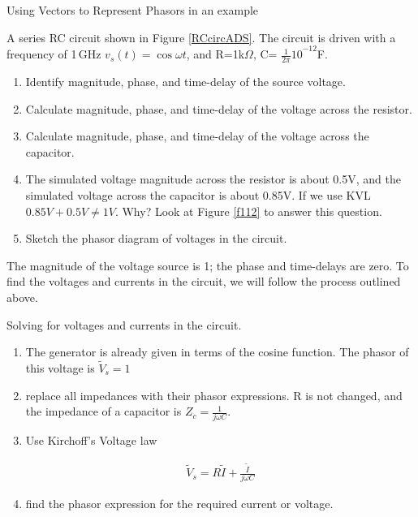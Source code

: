 \documentclass{ximera}
\begin{document}
\begin{example}
Using Vectors to Represent Phasors in an example

A series RC circuit shown in Figure \ref{RCcircADS}. The circuit is driven with a frequency of 1\,GHz $v_s(t)=  \cos \omega t$, and R=1k$\Omega $, C= ${\frac{1}{2\pi }10}^{-12}$F. 
 


\begin{enumerate}
\item  Identify magnitude, phase, and time-delay of the source voltage.

\item  Calculate magnitude, phase, and time-delay of the voltage across the resistor.

\item  Calculate magnitude, phase, and time-delay of the voltage across the capacitor.

\item  The simulated voltage magnitude across the resistor is about 0.5V, and the simulated voltage across the capacitor is about 0.85V.  If we use KVL $ 0.85V+0.5V \neq 1V$. Why? Look at Figure \ref{f112}  to answer this question.

\item Sketch the phasor diagram of voltages in the circuit. 

\end{enumerate}

\begin{explanation} 
The magnitude of the voltage source is 1; the phase and time-delays are zero. To find the voltages and currents in the circuit, we will follow the process outlined above.

Solving for voltages and currents in the circuit.
 \begin{enumerate}
\item The generator is already given in terms of the cosine function. The phasor of this voltage is $\tilde{V}_s= 1$ 
\item replace all impedances with their phasor expressions. R is not changed, and the impedance of a capacitor is $Z_c=\frac{1}{j \omega C}$.
\item  Use Kirchoff's Voltage law 

\begin{eqnarray}
\tilde{V}_s  = R \tilde{I}    + \frac{\tilde{I}}{j \omega C}  
\end{eqnarray}

\item find the phasor expression for the required current or voltage. 


\end{enumerate}
\end{explanation}
\end{example}
\end{document}
